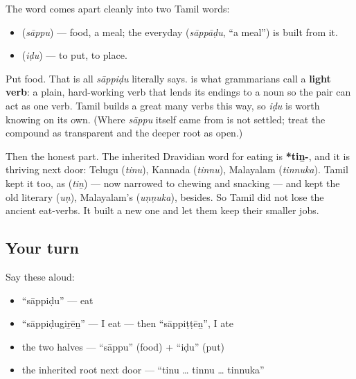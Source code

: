 \begin{cousinweb}
The word comes apart cleanly into two Tamil words:

\begin{itemize}
\raggedright
  \item \textbf{} (\emph{sāppu}) — food, a meal; the everyday \textbf{} (\emph{sāppāḍu}, \textquotedblleft{}a meal\textquotedblright{}) is built from it.
  \item \textbf{} (\emph{iḍu}) — to put, to place.
\end{itemize}

Put food. That is all \emph{sāppiḍu} literally says. \textbf{} is what grammarians call a \textbf{light verb}: a plain, hard-working verb that lends its endings to a noun so the pair can act as one verb. Tamil builds a great many verbs this way, so \emph{iḍu} is worth knowing on its own. (Where \emph{sāppu} itself came from is not settled; treat the compound as transparent and the deeper root as open.)

Then the honest part. The inherited Dravidian word for eating is \textbf{*tiṉ-}, and it is thriving next door: Telugu \textbf{} (\emph{tinu}), Kannada \textbf{} (\emph{tinnu}), Malayalam \textbf{} (\emph{tinnuka}). Tamil kept it too, as \textbf{} (\emph{tiṉ}) — now narrowed to chewing and snacking — and kept the old literary \textbf{} (\emph{uṇ}), Malayalam's \textbf{} (\emph{uṇṇuka}), besides. So Tamil did not lose the ancient eat-verbs. It built a new one and let them keep their smaller jobs.
\end{cousinweb}

\subsection*{Your turn}
Say these aloud:

\begin{itemize}
\raggedright
  \item \textquotedblleft{}sāppiḍu\textquotedblright{} — eat
  \item \textquotedblleft{}sāppiḍugiṟēṉ\textquotedblright{} — I eat — then \textquotedblleft{}sāppiṭṭēṉ\textquotedblright{}, I ate
  \item the two halves — \textquotedblleft{}sāppu\textquotedblright{} (food) + \textquotedblleft{}iḍu\textquotedblright{} (put)
  \item the inherited root next door — \textquotedblleft{}tinu … tinnu … tinnuka\textquotedblright{}
\end{itemize}

